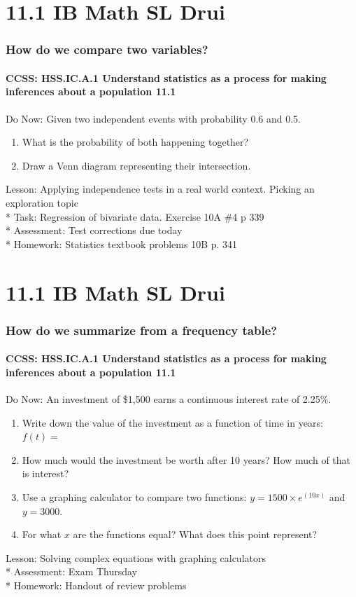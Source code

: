 \documentclass{beamer}
\begin{document}
  \section{11.1 IB Math SL Drui}
  \frame
  {
    \frametitle{How do we compare two variables?}
    \framesubtitle{CCSS: HSS.IC.A.1 Understand statistics as a process for making inferences about a population \qquad \alert{11.1}}

    \begin{block}{Do Now: Given two independent events with probability 0.6 and 0.5. }
    \begin{enumerate}
        \item What is the probability of both happening together?
        \item Draw a Venn diagram representing their intersection.
    \end{enumerate}
    \end{block}
    Lesson: Applying independence tests in a real world context. Picking an exploration topic\\*
    Task: Regression of bivariate data. Exercise 10A \#4 p 339\\*
    Assessment: Test corrections due today\\*
    Homework: Statistics textbook problems 10B p. 341\\
  }


  \section{11.1 IB Math SL Drui}
  \frame
  {
    \frametitle{How do we summarize from a frequency table?}
    \framesubtitle{CCSS: HSS.IC.A.1 Understand statistics as a process for making inferences about a population \qquad \alert{11.1}}

  \begin{block}{Do Now: An investment of \$1,500 earns a continuous interest rate of 2.25\%. }
    \begin{enumerate}
        \item Write down the value of the investment as a function of time in years: $f(t)=$
        \item How much would the investment be worth after 10 years? How much of that is interest?
        \item Use a graphing calculator to compare two functions: $y=1500 \times e^{(10x)}$ and $y=3000$.
        \item For what $x$ are the functions equal? What does this point represent?
    \end{enumerate}
    \end{block}
    Lesson: Solving complex equations with graphing calculators\\*
    Assessment: Exam Thursday\\*
    Homework: Handout of review problems\\
  }
\end{document}
